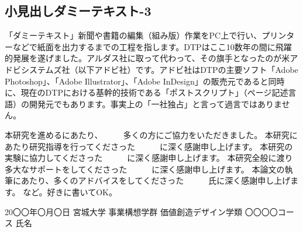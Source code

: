 \documentclass{cuxarticle}
\begin{document}
\subsection{小見出しダミーテキスト-3}
「ダミーテキスト」新聞や書籍の編集（組み版）作業をPC上で行い、プリンターなどで紙面を出力するまでの工程を指します。DTPはここ10数年の間に飛躍的発展を遂げました。アルダス社に取って代わって、その旗手となったのが米アドビシステムズ社（以下アドビ社）です。アドビ社はDTPの主要ソフト「Adobe Photoshop」、「Adobe Illustrator」、「Adobe InDesign」の販売元であると同時に、現在のDTPにおける基幹的技術である「ポストスクリプト」（ページ記述言語）の開発元でもあります。事実上の「一社独占」と言って過言ではありません。


本研究を進めるにあたり、　　　多くの方にご協力をいただきました。
本研究にあたり研究指導を行ってくださった　　　に深く感謝申し上げます。
本研究の実験に協力してくださった　　　に深く感謝申し上げます。
本研究全般に渡り多大なサポートをしてくださった　　　に深く感謝申し上げます。
本論文の執筆にあたり、多くのアドバイスをしてくださった　　　氏に深く感謝申し上げます。
など。好きに書いてOK。

20〇〇年〇月〇日
宮城大学 事業構想学群 価値創造デザイン学類 〇〇〇〇コース
氏名

\newpage
\renewcommand{\refname}{\huge 参考文献}


\end{document}
